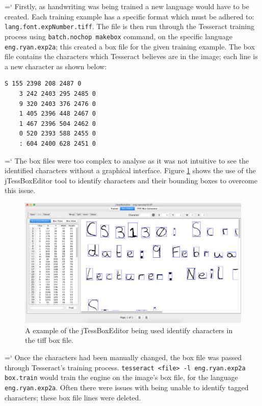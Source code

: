 {{\ttfamily \hyphenchar\the\font=`\-}%
Firstly, as handwriting was being trained a new language would have to be created. Each training example has a specific format which must be adhered to: \texttt{lang.font.expNumber.tiff}. The file is then run through the Tesseract training process using \texttt{batch.nochop makebox} command, on the specific language \texttt{eng.ryan.exp2a}; this created  a box file for the given training example. The box file contains the characters which Tesseract believes are in the image; each line is a new character as shown below:
\begin{center}
  \begin{lstlisting}[basicstyle=\normalsize\ttfamily]
    S 155 2398 208 2487 0
    3 242 2403 295 2485 0
    9 320 2403 376 2476 0
    1 405 2396 448 2467 0
    1 467 2396 504 2462 0
    0 520 2393 588 2455 0
    : 604 2400 628 2451 0
  \end{lstlisting}
\end{center}


{{\ttfamily \hyphenchar\the\font=`\-}%
The box files were too complex to analyse as it was not intuitive to see the identified characters without a graphical interface. Figure \ref{fig:box_editor} shows the use of the jTessBoxEditor \cite{citeulike:13926798} tool to identify characters and their bounding boxes to overcome this issue.

\begin{figure}[H]
  \centering
  \includegraphics[width=\textwidth]{images/box_editor}
  \caption{A example of the jTessBoxEditor being used identify characters in the tiff box file.}
  \label{fig:box_editor}
\end{figure}

{{\ttfamily \hyphenchar\the\font=`\-}%
Once the characters had been manually changed, the box file was passed through Tesseract's training process. \texttt{tesseract <file> -l eng.ryan.exp2a box.train} would train the engine on the image's box file, for the language \texttt{eng.ryan.exp2a}. Often there were issues with being unable to identify tagged characters; these box file lines were deleted.

}}}
